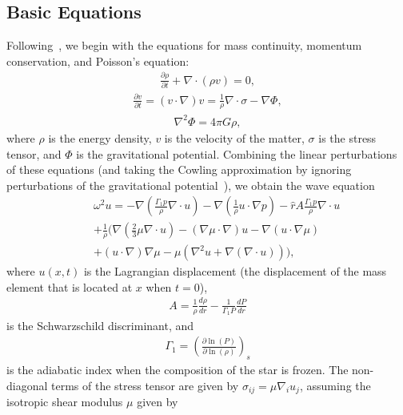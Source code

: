\documentclass[fleqn,usenatbib]{mnras}
\begin{document}
\subsection{Basic Equations}
\hspace{\parindent}Following~\citet{mcdermott1988nonradial}, we begin with the equations for mass continuity, momentum conservation, and Poisson's equation:
\begin{align}
\frac{\partial\rho}{\partial t}+\nabla\cdot(\rho v)=0,
\label{eq:continuity_eqn}
\end{align}
\begin{align}
\frac{\partial v}{\partial t}=(v\cdot \nabla)v=\frac{1}{\rho}\nabla\cdot\sigma-\nabla\Phi,
\label{eq:momentum_eqn}
\end{align}
\begin{align}
\nabla^2\Phi=4\pi G\rho,
\label{eq:Poisson_eqn}
\end{align}
\noindent where $\rho$ is the energy density, $v$ is the velocity of the matter, $\sigma$ is the stress tensor, and $\Phi$ is the gravitational potential. Combining the linear perturbations of these equations (and taking the Cowling approximation by ignoring perturbations of the gravitational potential~\citet{cowling1941non}), we obtain the wave equation
\begin{align}\nonumber
&&\omega^2u=-\nabla\left(\frac{\Gamma_1 p}{\rho}\nabla\cdot u\right)-\nabla\left(\frac{1}{\rho}u\cdot\nabla p\right)-\hat{r}A\frac{\Gamma_1 p}{\rho}\nabla\cdot u\\\nonumber
&&+\frac{1}{\rho}\biggr(\nabla\left(\frac{2}{3}\mu\nabla\cdot u\right)-\left(\nabla\mu\cdot\nabla\right)u-\nabla\left(u\cdot\nabla\mu\right)\\
&&+\left(u\cdot\nabla\right)\nabla\mu-\mu\left(\nabla^2 u+\nabla\left(\nabla\cdot u\right)\right)\biggr),
\label{eq:wave_eqn}
\end{align}
where $u(x,t)$ is the Lagrangian displacement (the displacement of the mass element that is located at $x$ when $t=0$),
\begin{align}
A=\frac{1}{\rho}\frac{d\rho}{dr}-\frac{1}{\Gamma_1P}\frac{dP}{dr}
\label{eq:schwartz_descrim}
\end{align}
\noindent is the Schwarzschild discriminant, and
\begin{align}
\Gamma_1=\left(\frac{\partial\ln(P)}{\partial\ln(\rho)}\right)_s
\label{eq:adiabatic_index}
\end{align}
\noindent is the adiabatic index when the composition of the star is frozen. The non-diagonal terms of the stress tensor are given by $\sigma_{ij} = \mu \nabla_i u_j$, assuming the isotropic shear modulus $\mu$ given by \citet{strohmayer1991shear}
\end{document}
